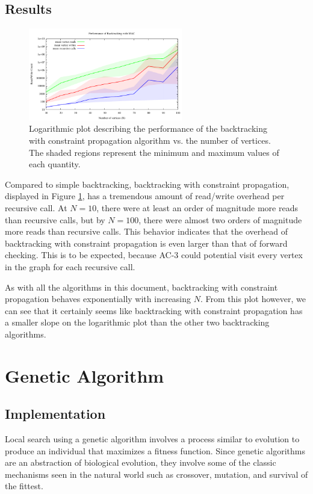 \documentclass{article}
\begin{document}
	\subsection{Results}
	
		\begin{figure}[h!]
			\centering
			\includegraphics[width=0.6\textwidth]{../results_5/backtracking_mac/bt_mac_performance}
			\caption{Logarithmic plot describing the performance of the backtracking with constraint propagation algorithm vs. the number of vertices. The shaded regions represent the minimum and maximum values of each quantity.}
			\label{mac_results}
		\end{figure}
		
		Compared to simple backtracking, backtracking with constraint propagation, displayed in Figure \ref{mac_results}, has a tremendous amount of read/write overhead per recursive call. At $N=10$, there were at least an order of magnitude more reads than recursive calls, but by $N=100$, there were almost two orders of magnitude more reads than recursive calls. This behavior indicates that the overhead of backtracking with constraint propagation is even larger than that of forward checking. This is to be expected, because AC-3 could potential visit every vertex in the graph for each recursive call.
		
		As with all the algorithms in this document, backtracking with constraint propagation behaves exponentially with increasing $N$. From this plot however, we can see that it certainly seems like backtracking with constraint propagation has a smaller slope on the logarithmic plot than the other two backtracking algorithms.
	
\section{Genetic Algorithm}

	\subsection{Implementation}
	Local search using a genetic algorithm involves a process similar to evolution to produce an individual that maximizes a fitness function. Since genetic algorithms are an abstraction of biological evolution, they involve some of the classic mechanisms seen in the natural world such as crossover, mutation, and survival of the fittest\cite{genetic}.
	
\end{document}
